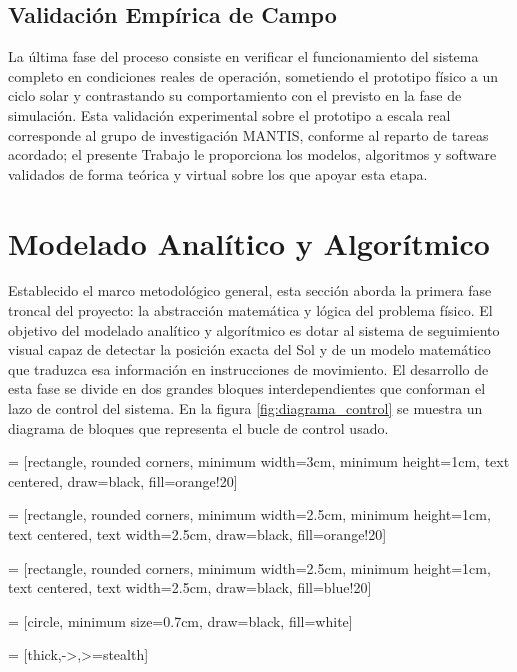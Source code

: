 \subsection{Validación Empírica de Campo}
La última fase del proceso consiste en verificar el funcionamiento del sistema completo en condiciones reales de operación, sometiendo el prototipo físico a un ciclo solar y contrastando su comportamiento con el previsto en la fase de simulación. Esta validación experimental sobre el prototipo a escala real corresponde al grupo de investigación MANTIS, conforme al reparto de tareas acordado; el presente Trabajo le proporciona los modelos, algoritmos y software validados de forma teórica y virtual sobre los que apoyar esta etapa.

\section{Modelado Analítico y Algorítmico}
Establecido el marco metodológico general, esta sección aborda la primera fase troncal del proyecto: la abstracción matemática y lógica del problema físico. El objetivo del modelado analítico y algorítmico es dotar al sistema de seguimiento visual capaz de detectar la posición exacta del Sol y de un modelo matemático que traduzca esa información en instrucciones de movimiento. El desarrollo de esta fase se divide en dos grandes bloques interdependientes que conforman el lazo de control del sistema. En la figura \ref{fig:diagrama_control} se muestra un diagrama de bloques que representa el bucle de control usado.


 = [rectangle, rounded corners,
minimum width=3cm, minimum height=1cm,
text centered, draw=black, fill=orange!20]

 = [rectangle, rounded corners,
minimum width=2.5cm, minimum height=1cm,
text centered, text width=2.5cm,
draw=black, fill=orange!20]

 = [rectangle, rounded corners,
minimum width=2.5cm, minimum height=1cm,
text centered, text width=2.5cm,
draw=black, fill=blue!20]

 = [circle, minimum size=0.7cm, draw=black, fill=white]

 = [thick,->,>=stealth]

